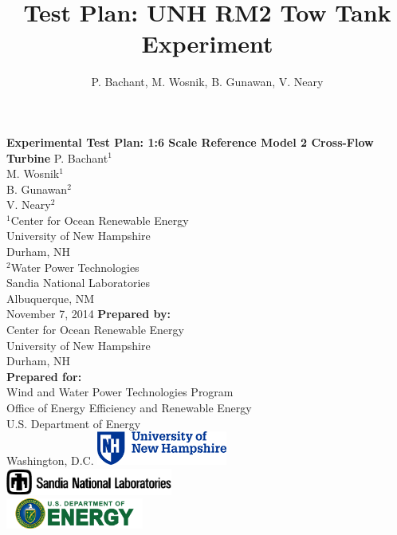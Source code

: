 \documentclass[14pt,letterpaper]{scrreprt}
\author{P. Bachant, M. Wosnik, B. Gunawan, V. Neary}
\title{Test Plan: UNH RM2 Tow Tank Experiment}
\begin{document}
\begin{titlepage}
    \centering
    \vfill
    {\bfseries\Large
        Experimental Test Plan: 1:6 Scale Reference Model 2 Cross-Flow Turbine
    }  
    \vskip1cm
    P. Bachant$^1$\\
    M. Wosnik$^1$\\
    B. Gunawan$^2$\\
    V. Neary$^2$\\  
    \vfill
    $^1$Center for Ocean Renewable Energy \\
    University of New Hampshire \\
    Durham, NH \\
    \vspace{0.05in}
    $^2$Water Power Technologies \\
    Sandia National Laboratories \\
    Albuquerque, NM \\
    \vfill
    November 7, 2014
    \vfill
    \textbf{Prepared by:}\\
    Center for Ocean Renewable Energy\\
    University of New Hampshire\\
    Durham, NH\\
    \vspace{0.05in}
    \textbf{Prepared for:} \\
    Wind and Water Power Technologies Program \\
    Office of Energy Efficiency and Renewable Energy \\
    U.S. Department of Energy \\
    Washington, D.C.
    \vfill
    \includegraphics[width=0.32\textwidth]{Figures/unhlogo} \\
    \vspace{0.1in}
    \includegraphics[width=0.41\textwidth]{Figures/snllogo} \\
    \vspace{0.1in}
    \includegraphics[width=0.34\textwidth]{Figures/doelogo}
    \vfill
\end{titlepage}
\end{document}
